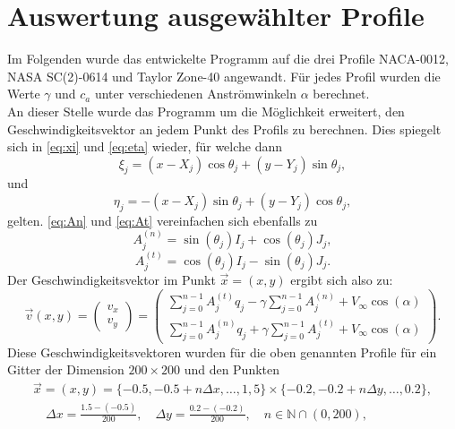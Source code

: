 \section{Auswertung ausgewählter Profile}
\label{chap:profilauswertung}
Im Folgenden wurde das entwickelte Programm auf die drei Profile NACA-0012, NASA SC(2)-0614 und Taylor Zone-40 angewandt. Für jedes Profil wurden die Werte $\gamma$ und $c_a$ unter verschiedenen Anströmwinkeln $\alpha $ berechnet. \\
An dieser Stelle wurde das Programm um die Möglichkeit erweitert, den Geschwindigkeitsvektor an jedem Punkt des Profils zu berechnen. Dies spiegelt sich in \eqref{eq:xi} und \eqref{eq:eta} wieder, für welche dann
\begin{equation}
\xi_{j} =  (x - X_j) \cos \theta _j + (y - Y_j) \sin \theta _j,
\end{equation}
und
\begin{equation}
\eta_{j} =  -(x - X_j) \sin \theta _j + (y - Y_j) \cos \theta _j,
\end{equation}
gelten. \eqref{eq:An} und \eqref{eq:At} vereinfachen sich ebenfalls zu
\begin{equation}
A_{j}^{(n)} = \sin {(\theta _j)} I_{j} + \cos{( \theta _j)} J_{j},
\end{equation}
\begin{equation}
A_{j}^{(t)} =  \cos{(\theta _j)} I_{j} - \sin{( \theta _j)} J_{j}.
\end{equation}
Der Geschwindigkeitsvektor im Punkt $\vec x = (x,y)$ ergibt sich also zu:
\begin{equation}
\vec v (x,y) = 
\begin{pmatrix}
v_x \\
v_y
\end{pmatrix}
=
\begin{pmatrix}
\displaystyle{\sum_{j=0}^{n-1} A_{j}^{(t)} q_j - \gamma \sum_{j=0}^{n-1}A_{j}^{(n)} + V_{\infty} \cos{(\alpha)}} \\[0.6cm]
\displaystyle{\sum_{j=0}^{n-1} A_{j}^{(n)} q_j + \gamma \sum_{j=0}^{n-1}A_{j}^{(t)} + V_{\infty} \cos{(\alpha)}}
\end{pmatrix}.
\end{equation}
Diese Geschwindigkeitsvektoren wurden für die oben genannten Profile für ein Gitter der Dimension $200 \times 200$ und den Punkten
\begin{align*}
\vec x = (x,y) = \{-0.5, -0.5 + n \Delta x,\ldots, 1,5\} \times \{-0.2, -0.2 + n \Delta y, \ldots, 0.2\}, \\ \quad \Delta x = \frac{1.5 - (-0.5)}{200}, \quad \Delta y = \frac{0.2 - (-0.2)}{200}, \quad n \in \mathbb{N} \cap (0,200),
\end{align*} 
